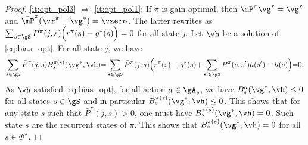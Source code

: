 \begin{proof}
    \ref{it:opt_pol3} $\Rightarrow$ \ref{it:opt_pol1}: If $\pi$ is gain optimal, then $\mP^\pi \vg^*=\vg^*$ and $\bar{\mP}^\pi(\vr^\pi-\vg^*)=\vzero$.
    The latter rewrites as $\sum_{s\in\gS}\bar{P}^\pi(j,s)\Big(r^{\pi}(s)-g^*(s)\Big) =0$ for all state $j$. Let $\vh$ be a solution of \eqref{eq:bias_opt}.
    For all state $j$, we have    
    \begin{align*}
        \sum_{s\in\gS}\bar{P}^\pi(j,s)B^{\pi(s)}_s(\vg^*,\vh) {=} \sum_{s\in\gS}\bar{P}^\pi(j,s)\Big(r^{\pi}(s)-g^*(s) {+}\sum_{s'\in\gS}P^{\pi}(s,s')h(s') -h(s)\Big) {=}0.
    \end{align*}
    As $\vh$ satisfied \eqref{eq:bias_opt}, for all action $a\in\gA_s$, we have $B^{a}_s(\vg^*,\vh) \le0$ for all states $s\in\gS$ and in particular $B^{\pi(s)}_s(\vg^*,\vh) \le0$.
    This shows that for any state $s$ such that $\bar{P}^\pi(j,s)>0$, one must have $B^{\pi(s)}_s(\vg^*,\vh) =0$. Such state $s$ are the recurrent states of $\pi$.
    This shows that $B^{\pi(s)}_s(\vg^*,\vh) =0$ for all $s\in\Phi^\pi$.
\end{proof}

